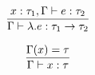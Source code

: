 \documentclass{article}
\begin{document}
\pagestyle{empty}
\noindent
\renewcommand{\S}{\mathcal{S}}
\begin{minipage}{3.4cm}\smallskip%
$\begin{array}{c}
\dfrac{x : \tau_1, \Gamma \vdash e : \tau_2}{\Gamma \vdash \lambda.e : \tau_1 \rightarrow \tau_2}\bigskip\\
\dfrac{\Gamma(x) = \tau}{\Gamma \vdash x : \tau}
\end{array}$
\end{minipage}%
\end{document}
